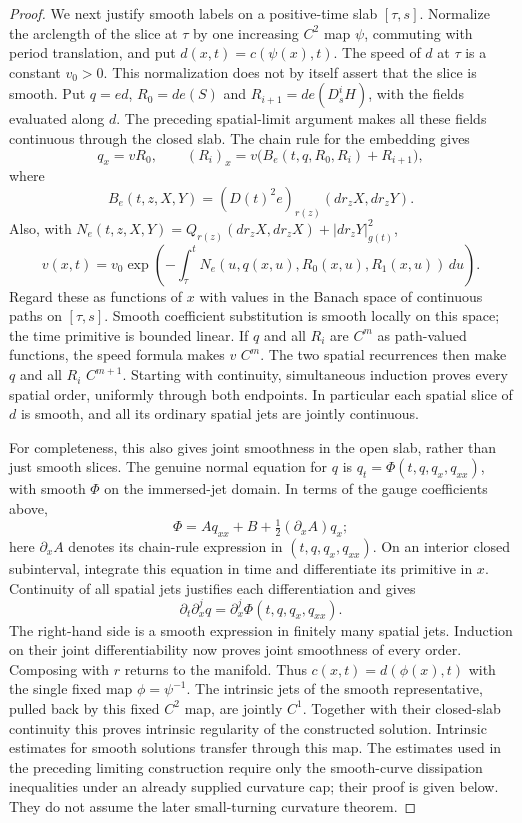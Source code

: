 \begin{proof}
We next justify smooth labels on a positive-time slab $[\tau,s]$.
Normalize the arclength of the slice at $\tau$ by one increasing
$C^2$ map $\psi$, commuting with period translation, and put
$d(x,t)=c(\psi(x),t)$.  The speed of $d$ at $\tau$ is a constant
$v_0>0$.  This normalization does not by itself assert that the
slice is smooth.  Put $q=ed$, $R_0=de(S)$ and
$R_{i+1}=de(D_s^iH)$, with the fields evaluated along $d$.
The preceding spatial-limit argument makes all these fields
continuous through the closed slab.  The chain rule for the embedding gives
\[
 q_x=vR_0,\qquad
 (R_i)_x=v\bigl(B_e(t,q,R_0,R_i)+R_{i+1}\bigr),
\]
where
\[
 B_e(t,z,X,Y)=(D(t)^2e)_{r(z)}(dr_zX,dr_zY).
\]
Also, with
$N_e(t,z,X,Y)=Q_{r(z)}(dr_zX,dr_zX)+|dr_zY|_{g(t)}^2$,
\[
 v(x,t)=v_0\exp\left(-\int_\tau^t
             N_e(u,q(x,u),R_0(x,u),R_1(x,u))\,du\right).
\]
Regard these as functions of $x$ with values in the Banach space
of continuous paths on $[\tau,s]$.  Smooth coefficient substitution
is smooth locally on this space; the time primitive is bounded
linear.  If $q$ and all $R_i$ are $C^m$ as path-valued functions,
the speed formula makes $v$ $C^m$.  The two spatial recurrences
then make $q$ and all $R_i$ $C^{m+1}$.  Starting with continuity,
simultaneous induction proves every spatial order, uniformly
through both endpoints.  In particular each spatial slice of $d$
is smooth, and all its ordinary spatial jets are jointly continuous.

For completeness, this also gives joint smoothness in the open
slab, rather than just smooth slices.  The genuine normal equation
for $q$ is $q_t=\Phi(t,q,q_x,q_{xx})$, with smooth $\Phi$ on the
immersed-jet domain.  In terms of the gauge coefficients above,
\[
 \Phi=Aq_{xx}+B+\tfrac12(\partial_x A)q_x;
\]
here $\partial_x A$ denotes its chain-rule expression in
$(t,q,q_x,q_{xx})$.  On an interior closed subinterval, integrate
this equation in time and differentiate its primitive in $x$.
Continuity of all spatial jets justifies each differentiation and gives
\[
 \partial_t\partial_x^j q
       =\partial_x^j\Phi(t,q,q_x,q_{xx}).
\]
The right-hand side is a smooth expression in finitely many
spatial jets.  Induction on their joint differentiability now
proves joint smoothness of every order.  Composing with $r$
returns to the manifold.  Thus
$c(x,t)=d(\phi(x),t)$ with the single fixed map $\phi=\psi^{-1}$.
The intrinsic jets of the smooth representative, pulled back by
this fixed $C^2$ map, are jointly $C^1$.  Together with their
closed-slab continuity this proves intrinsic regularity of the
constructed solution.  Intrinsic estimates for smooth solutions
transfer through this map.
The estimates used in the preceding limiting construction require
only the smooth-curve dissipation inequalities under an already
supplied curvature cap; their proof is given below.  They do not
assume the later small-turning curvature theorem.


\end{proof}
